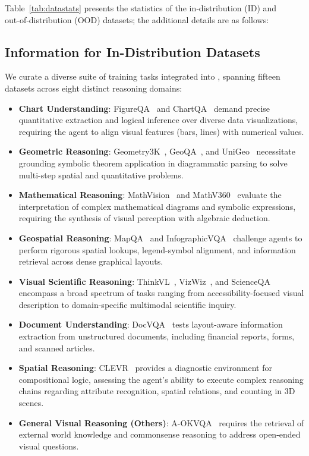 Table~\ref{tab:datastats} presents the statistics of the in‑distribution (ID) and out‑of‑distribution (OOD) datasets; the additional details are as follows:
\subsection{Information for In-Distribution Datasets}
We curate a diverse suite of training tasks integrated into \env, spanning fifteen datasets across eight distinct reasoning domains:
\begin{itemize}
    \item \textbf{Chart Understanding}: {FigureQA}~\cite{ebrahimi2018figureqa} and {ChartQA}~\cite{masry2022chartqa} demand precise quantitative extraction and logical inference over diverse data visualizations, requiring the agent to align visual features (bars, lines) with numerical values.
    \item \textbf{Geometric Reasoning}: {Geometry3K}~\cite{lu2021inter}, {GeoQA}~\cite{chen2021geoqa}, and {UniGeo}~\cite{chen2022unigeo} necessitate grounding symbolic theorem application in diagrammatic parsing to solve multi-step spatial and quantitative problems.
    \item \textbf{Mathematical Reasoning}: {MathVision}~\cite{wang2024measuringmultimodalmathematicalreasoning} and {MathV360}~\cite{shi2024mathllavabootstrappingmathematicalreasoning} evaluate the interpretation of complex mathematical diagrams and symbolic expressions, requiring the synthesis of visual perception with algebraic deduction.
    \item \textbf{Geospatial Reasoning}: {MapQA}~\cite{chang2022mapqa} and {InfographicVQA}~\cite{mathew2022infographicvqa} challenge agents to perform rigorous spatial lookups, legend-symbol alignment, and information retrieval across dense graphical layouts.
    \item \textbf{Visual Scientific Reasoning}: {ThinkVL}~\cite{deng2025openvlthinkercomplexvisionlanguagereasoning}, {VizWiz}~\cite{bigham2010vizwiz}, and {ScienceQA}~\cite{lu2022learn} encompass a broad spectrum of tasks ranging from accessibility-focused visual description to domain-specific multimodal scientific inquiry.
    \item \textbf{Document Understanding}: {DocVQA}~\cite{mathew2021docvqa} tests layout-aware information extraction from unstructured documents, including financial reports, forms, and scanned articles.
    \item \textbf{Spatial Reasoning}: {CLEVR}~\cite{johnson2017clevr} provides a diagnostic environment for compositional logic, assessing the agent's ability to execute complex reasoning chains regarding attribute recognition, spatial relations, and counting in 3D scenes.
    \item \textbf{General Visual Reasoning (Others)}: {A-OKVQA}~\cite{schwenk2022okvqa} requires the retrieval of external world knowledge and commonsense reasoning to address open-ended visual questions.
\end{itemize}


